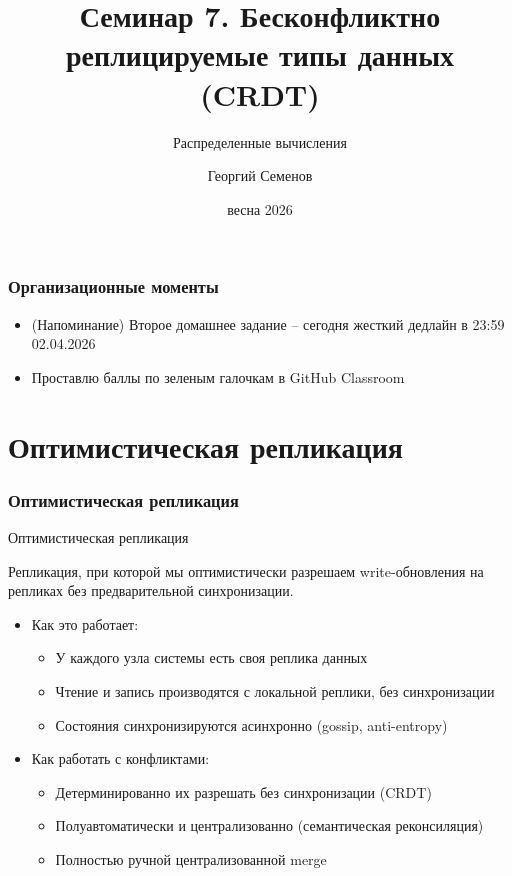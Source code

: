 \documentclass{beamer}
\title{Семинар 7. Бесконфликтно реплицируемые типы данных (CRDT)}
\subtitle{Распределенные вычисления}
\author{Георгий Семенов}
\institute{Институт прикладных компьютерных наук \\ Университет ИТМО}
\date{весна 2026}
\newenvironment{definitionbox}[1][Определение]{%
  \begin{exampleblock}{#1}
}{%
  \end{exampleblock}
}
\begin{document}
\frame{\titlepage}

\begin{frame}
\frametitle{Организационные моменты}

\begin{itemize}
  \item (Напоминание) Второе домашнее задание – сегодня жесткий дедлайн в 23:59 02.04.2026
  \item Проставлю баллы по зеленым галочкам в GitHub Classroom
\end{itemize}

\end{frame}

\section{Оптимистическая репликация}

\begin{frame}
\frametitle{Оптимистическая репликация}

\begin{definitionbox}[Оптимистическая репликация]
Репликация, при которой мы оптимистически разрешаем write-обновления на репликах без предварительной синхронизации.
\end{definitionbox}

\begin{itemize}
  \item Как это работает:
  \begin{itemize}
    \item У каждого узла системы есть своя реплика данных
    \item Чтение и запись производятся с локальной реплики, без синхронизации
    \item Состояния синхронизируются асинхронно (gossip, anti-entropy)
  \end{itemize}
  \item Как работать с конфликтами:
  \begin{itemize}
    \item Детерминированно их разрешать без синхронизации (CRDT)
    \item Полуавтоматически и централизованно (семантическая реконсиляция)
    \item Полностью ручной централизованной merge
  \end{itemize}
\end{itemize}

\end{frame}
\end{document}
